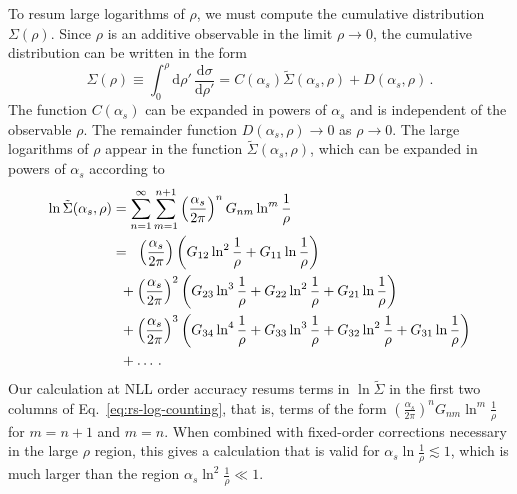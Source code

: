 \documentclass[letterpaper,11pt]{article}
\newcommand{\Eq}[1]{Eq.~\eqref{#1}}
\begin{document}
To resum large logarithms of $\rho$, we must compute the cumulative distribution $\Sigma(\rho)$. 
%
Since $\rho$ is an additive observable in the limit $\rho \rightarrow 0$, the cumulative distribution can be written in the form
\begin{equation}
\Sigma(\rho) \equiv \int_0^\rho \text{d}\rho'\, \frac{\text{d}\sigma}{\text{d}\rho'} = C(\alpha_s) \tilde{\Sigma}(\alpha_s,\rho) + D(\alpha_s,\rho)\,.
\end{equation}
The function $C(\alpha_s)$ can be expanded in powers of $\alpha_s$ and is independent of the observable $\rho$. 
%
The remainder function $D(\alpha_s,\rho) \rightarrow 0$ as $\rho \rightarrow 0$. 
%
The large logarithms of $\rho$ appear in the function $\tilde{\Sigma}(\alpha_s,\rho)$, which can be expanded in powers of $\alpha_s$ according to~\cite{Almeida:2014uva}
\begin{align}
\label{eq:rs-log-counting}
\ln \tilde{\Sigma}(\alpha_s,\rho) &= \sum_{n=1}^\infty \sum_{m=1}^{n+1}\left(\frac{\alpha_s}{2\pi}\right)^n G_{nm} \ln^{m}\frac{1}{\rho}\\ \nonumber
&=\hspace{0.2cm} \left(\frac{\alpha_s}{2\pi}\right) \left(G_{12}\ln^2 \frac{1}{\rho} + G_{11}\ln \frac{1}{\rho} \right) \\ \nonumber
&\hspace{0.2cm}+ \left(\frac{\alpha_s}{2\pi}\right)^2 \left(G_{23}\ln^3 \frac{1}{\rho} + G_{22}\ln^2 \frac{1}{\rho} + G_{21}\ln \frac{1}{\rho} \right) \\ \nonumber
&\hspace{0.2cm}+ \left(\frac{\alpha_s}{2\pi}\right)^3 \left(G_{34}\ln^4 \frac{1}{\rho} + G_{33}\ln^3 \frac{1}{\rho} + G_{32}\ln^2 \frac{1}{\rho} + G_{31}\ln \frac{1}{\rho} \right)\\ \nonumber
&\hspace{0.2cm} + \ldots\,.
\end{align}
Our calculation at NLL order accuracy resums terms in $\ln \tilde{\Sigma}$ in the first two columns of \Eq{eq:rs-log-counting}, that is, terms of the form $\left(\tfrac{\alpha_s}{2\pi}\right)^n G_{nm}\ln^m\tfrac{1}{\rho}$ for $m=n+1$ and $m=n$. 
%
When combined with fixed-order corrections necessary in the large $\rho$ region, this gives a calculation that is valid for $\alpha_s\ln\tfrac{1}{\rho} \lesssim1$, which is much larger than the region $\alpha_s\ln^2\tfrac{1}{\rho} \ll 1$. 
\end{document}

